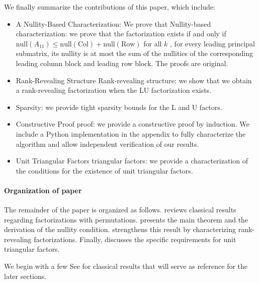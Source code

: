 \documentclass[10pt,twoside]{siamart1116}
\numberwithin{theorem}{section}
\providecommand{\DIFadd}[1]{{\protect\color{blue} \sf #1}} %
\providecommand{\DIFdel}[1]{{\protect\color{red} \scriptsize #1}} %
\providecommand{\DIFaddbegin}{} %
\providecommand{\DIFaddend}{} %
\providecommand{\DIFdelbegin}{} %
\providecommand{\DIFdelend}{} %
\begin{document}
We \DIFdelbegin \DIFdel{finally }\DIFdelend summarize the contributions of this paper, which include:
\begin{itemize}
  \item \DIFdelbegin \DIFdel{A Nullity-Based Characterization: We prove that }\DIFdelend \DIFaddbegin \DIFadd{Nullity-based characterization: we prove that the }\DIFaddend factorization exists if and only if\DIFdelbegin \DIFdel{$\text{null}(A_{11}) \le \text{null}(\text{Col}) + \text{null}(\text{Row})$ for all $k$}\DIFdelend \DIFaddbegin \DIFadd{, for every leading principal submatrix, its nullity is at most the sum of the nullities of the corresponding leading column block and leading row block}\DIFaddend . The proofs are original.
  \item \DIFdelbegin \DIFdel{Rank-Revealing Structure}\DIFdelend \DIFaddbegin \DIFadd{Rank-revealing structure}\DIFaddend : we show that we obtain a rank-revealing factorization when the LU factorization exists.
  \item Sparsity: we provide tight sparsity bounds for the L and U factors.
  \item Constructive \DIFdelbegin \DIFdel{Proof}\DIFdelend \DIFaddbegin \DIFadd{proof}\DIFaddend : we provide a constructive proof by induction. We include a Python implementation in the appendix to fully characterize the algorithm and allow independent verification of our results.
  \item Unit \DIFdelbegin \DIFdel{Triangular Factors}\DIFdelend \DIFaddbegin \DIFadd{triangular factors}\DIFaddend : we provide a characterization of the conditions for the existence of unit triangular factors.
\end{itemize}

\paragraph{Organization of paper}
The remainder of the paper is organized as follows.  reviews classical results regarding factorizations with permutations.  presents the main theorem and the derivation of the nullity condition.  strengthens this result by characterizing rank-revealing factorizations. Finally,  discusses the specific requirements for unit triangular factors. \DIFdelbegin %

\DIFdel{We begin with a few }\DIFdelend \DIFaddbegin \DIFadd{See } \DIFadd{for }\DIFaddend classical results that will serve as reference for the later sections.
\end{document}
